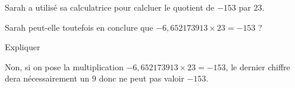 \begin{exercice*}[Calculatrice]
    Sarah a utilisé sa calculatrice pour calcluer le quotient de $-153$ par $23$.


    Sarah peut-elle toutefois en conclure que $-6,652173913 \times 23 = -153$ ?

    Expliquer    
\end{exercice*}
\begin{corrige}
    Non, si on pose la multiplication $-6,652173913 \times 23 = -153$, le dernier chiffre dera nécessairement un $9$
    donc ne peut pas valoir $-153$.
\end{corrige}

